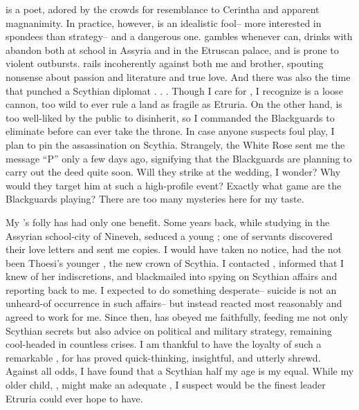 \documentclass[char]{Kos}
\begin{document}
\cPoet{\They} is a poet, adored by the crowds for \cPoet{\their} resemblance to Cerintha and \cPoet{\their} apparent magnanimity. In practice, however, \cPoet{\they} is an idealistic fool-- more interested in spondees than strategy-- and a dangerous one. \cPoet{\They} gambles whenever \cPoet{\they} can, drinks with abandon both at school in Assyria and in the Etruscan palace, and is prone to violent outbursts. \cPoet{\They} rails incoherently against both me and \cPoet{\their} brother, spouting nonsense about passion and literature and true love. And there was also the time that \cPoet{\they} punched a Scythian diplomat . . . Though I care for \cPoet{\them}, I recognize \cPoet{\they} is a loose cannon, too wild to ever rule a land as fragile as Etruria. On the other hand, \cPoet{\they} is too well-liked by the public to disinherit, so I commanded the Blackguards to eliminate \cPoet{\them} before \cPoet{\they} can ever take the throne. In case anyone suspects foul play, I plan to pin the assassination on Scythia. Strangely, the White Rose sent me the message ``P'' only a few days ago, signifying that the Blackguards are planning to carry out the deed quite soon. Will they strike at the wedding, I wonder? Why would they target him at such a high-profile event? Exactly what game are the Blackguards playing? There are too many mysteries here for my taste.

My \cPoet{\offspring}'s folly has had only one benefit. Some years back, while studying in the Assyrian school-city of Nineveh, \cPoet{\they} seduced a young \cBride{\human}; one of \cPoet{\their} servants discovered their love letters and sent me copies. I would have taken no notice, had the \cBride{\they} not been Thoesi's younger \cBride{\sibling}, the new crown \cBride{\prince} of Scythia. I contacted \cBride{\them}, informed \cBride{\them} that I knew of her indiscretions, and blackmailed \cBride{\them} into spying on Scythian affairs and reporting back to me. I expected \cBride{\them} to do something desperate-- suicide is not an unheard-of occurrence in such affairs-- but \cBride{\they} instead reacted most reasonably and agreed to work for me. Since then, \cBride{\they} has obeyed me faithfully, feeding me not only Scythian secrets but also advice on political and military strategy, remaining cool-headed in countless crises. I am thankful to have the loyalty of such a remarkable \cBride{\human}, for \cBride{\they} has proved \cBride{\themself} quick-thinking, insightful, and utterly shrewd. Against all odds, I have found that a Scythian \cBride{\prince} half my age is my equal. While my older child, \cGroom{}, might make an adequate \cGroom{\monarch}, I suspect \cBride{\they} would be the finest leader Etruria could ever hope to have.
\end{document}
